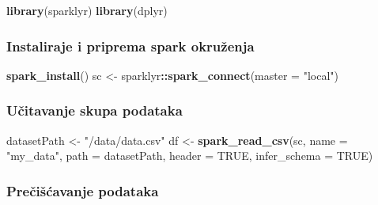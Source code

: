 \documentclass[]{article}
\newenvironment{Shaded}{\begin{snugshade}}{\end{snugshade}}
\newcommand{\DataTypeTok}[1]{\textcolor[rgb]{0.13,0.29,0.53}{#1}}
\newcommand{\KeywordTok}[1]{\textcolor[rgb]{0.13,0.29,0.53}{\textbf{#1}}}
\newcommand{\NormalTok}[1]{#1}
\newcommand{\OperatorTok}[1]{\textcolor[rgb]{0.81,0.36,0.00}{\textbf{#1}}}
\newcommand{\OtherTok}[1]{\textcolor[rgb]{0.56,0.35,0.01}{#1}}
\newcommand{\StringTok}[1]{\textcolor[rgb]{0.31,0.60,0.02}{#1}}
\begin{document}
\begin{Shaded}
\begin{Highlighting}[]
\KeywordTok{library}\NormalTok{(sparklyr)}
\KeywordTok{library}\NormalTok{(dplyr)}
\end{Highlighting}
\end{Shaded}

\hypertarget{instaliraje-i-priprema-spark-okruux17eenja}{%
\subsubsection{Instaliraje i priprema spark
okruženja}\label{instaliraje-i-priprema-spark-okruux17eenja}}

\begin{Shaded}
\begin{Highlighting}[]
\KeywordTok{spark_install}\NormalTok{()}
\NormalTok{sc <-}\StringTok{ }\NormalTok{sparklyr}\OperatorTok{::}\KeywordTok{spark_connect}\NormalTok{(}\DataTypeTok{master =} \StringTok{"local"}\NormalTok{)}
\end{Highlighting}
\end{Shaded}

\hypertarget{uux10ditavanje-skupa-podataka}{%
\subsubsection{Učitavanje skupa
podataka}\label{uux10ditavanje-skupa-podataka}}

\begin{Shaded}
\begin{Highlighting}[]
\NormalTok{datasetPath <-}\StringTok{ "/data/data.csv"}
\NormalTok{df <-}\StringTok{ }\KeywordTok{spark_read_csv}\NormalTok{(sc, }\DataTypeTok{name =} \StringTok{"my_data"}\NormalTok{, }\DataTypeTok{path =}\NormalTok{ datasetPath, }\DataTypeTok{header =} \OtherTok{TRUE}\NormalTok{, }\DataTypeTok{infer_schema =} \OtherTok{TRUE}\NormalTok{)}
\end{Highlighting}
\end{Shaded}

\hypertarget{preux10diux161ux107avanje-podataka}{%
\subsubsection{Prečišćavanje
podataka}\label{preux10diux161ux107avanje-podataka}}
\end{document}
